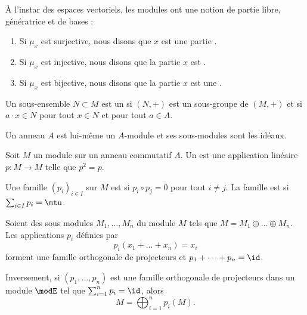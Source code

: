 \begin{definition}      \label{DefBasePouyKj}
    À l'instar des espaces vectoriels, les modules ont une notion de partie libre, génératrice et de bases :
    \begin{enumerate}
        \item
            Si \( \mu_x\) est surjective, nous disons que \( x\) est une partie .
        \item
            Si \( \mu_x\) est injective, nous disons que la partie \( x\) est .
        \item
            Si \( \mu_x\) est bijective, nous disons que la partie \( x\) est une .
    \end{enumerate}
\end{definition}

\begin{definition}
  Un sous-ensemble \( N\subset M\) est un  si \( (N,+)\) est un sous-groupe de \( (M,+)\) et si \( a\cdot x\in N\) pour tout \( x\in N\) et pour tout \( a\in A\).
\end{definition}

\begin{example}
    Un anneau \( A\) est lui-même un \( A\)-module et ses sous-modules sont les idéaux.
\end{example}

\begin{definition}
    Soit \( M\) un module sur un anneau commutatif \( A\). Un  est une application linéaire \( p\colon M\to M\) telle que \( p^2=p\).

    Une famille \( (p_i)_{i\in I}\) sur \( M\) est  si \( p_i\circ p_j=0\) pour tout \( i\neq j\). La famille est  si \( \sum_{i\in I}p_i=\mtu\).
\end{definition}

\begin{theorem}     \label{ThoProjModpAlsUR}
    Soient des sous modules \( M_1,\ldots,M_n\) du module \( M \) tels que \( M=M_1\oplus\ldots\oplus M_n\). Les applications \( p_i\) définies par
    \begin{equation}
        p_i(x_1+\ldots+x_n)=x_i
    \end{equation}
    forment une famille orthogonale de projecteurs et \( p_1+\cdots +p_n=\id\).

    Inversement, si \( (p_1,\ldots, p_n)\) est une famille orthogonale de projecteurs dans un module \( \modE\) tel que \( \sum_{i=1}^np_i=\id\), alors
    \begin{equation}
        M=\bigoplus_{i=1}^np_i(M).
    \end{equation}
\end{theorem}


